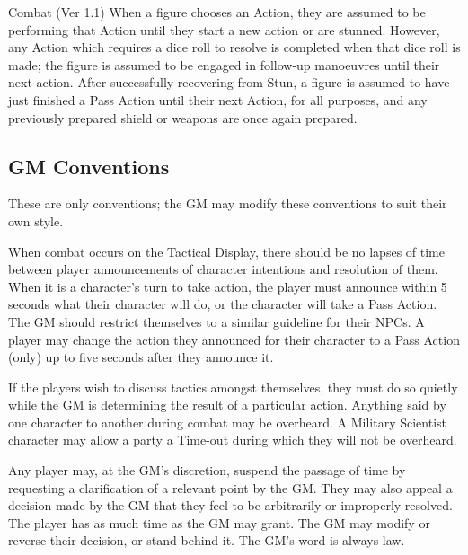 \begin{Chapter}{Combat (Ver 1.1)}
When a figure chooses an Action, they are assumed to be performing
that Action until they start a new action or are stunned. However, any
Action which requires a dice roll to resolve is completed when that
dice roll is made; the figure is assumed to be engaged in follow-up
manoeuvres until their next action.  After successfully recovering
from Stun, a figure is assumed to have just finished a Pass Action
until their next Action, for all purposes, and any previously prepared
shield or weapons are once again prepared.

\subsection{GM Conventions}

These are only conventions; the GM may modify these conventions to
suit their own style.

\begin{Description}
  
\item[Announcements of Intent] When combat occurs on the Tactical
  Display, there should be no lapses of time between player
  announcements of character intentions and resolution of them.  When
  it is a character’s turn to take action, the player must announce
  within 5 seconds what their character will do, or the character will
  take a Pass Action.  The GM should restrict themselves to a similar
  guideline for their NPCs. A player may change the action they
  announced for their character to a Pass Action (only) up to five
  seconds after they announce it.

\item[Discussions during Combat] If the players wish to discuss
  tactics amongst themselves, they must do so quietly while the GM is
  determining the result of a particular action. Anything said by one
  character to another during combat may be overheard.  A Military
  Scientist character may allow a party a Time-out during which they
  will not be overheard.

\item[Rule Clarification] Any player may, at the GM’s discretion,
  suspend the passage of time by requesting a clarification of a
  relevant point by the GM.  They may also appeal a decision made by
  the GM that they feel to be arbitrarily or improperly resolved.  The
  player has as much time as the GM may grant.  The GM may modify or
  reverse their decision, or stand behind it.  The GM’s word is always
  law.


\end{Description}
\end{Chapter}

